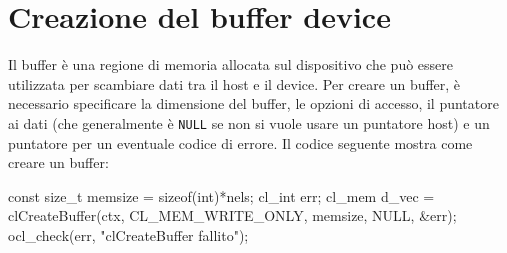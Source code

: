 \section{Creazione del buffer device}\label{sec:opencl_basi_buffer}

Il buffer è una regione di memoria allocata sul dispositivo che può essere utilizzata per scambiare dati tra il host e il device. Per creare un buffer, è necessario specificare la dimensione del buffer, le opzioni di accesso, il puntatore ai dati (che generalmente è \texttt{NULL} se non si vuole usare un puntatore host) e un puntatore per un eventuale codice di errore. Il codice seguente mostra come creare un buffer:
\begin{code}[caption={Creazione di un buffer OpenCL}, label={code:opencl_basi_buffer}]
    const size_t memsize = sizeof(int)*nels;
    cl_int err;
    cl_mem d_vec = clCreateBuffer(ctx, CL_MEM_WRITE_ONLY, memsize, NULL, &err);
    ocl_check(err, "clCreateBuffer fallito");
\end{code}

